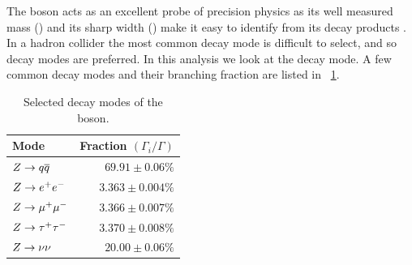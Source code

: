 The \Z boson acts as an excellent probe of precision physics as its well
measured mass (\Zmass) and its sharp width (\Zwidth) make it easy to identify
from its decay products \cite{pdg2014}. In a hadron collider the most common
\Ztoqq decay mode is difficult to select, and so \Ztoll decay modes are
preferred. In this analysis we look at the \Ztoee decay mode. A few common
decay modes and their branching fraction are listed in
\TAB~\ref{table:z_decays}.

\begin{table}[h]
\centering
\begin{center}
    \begin{tabular}{ l  r }
        Mode & Fraction $\left( \Gamma_{i} / \Gamma \right)$ \\ \hline
        $Z \to q \overline{q}$ & $69.91 \pm 0.06\%$ \\
        $Z \to e^{+} e^{-}$ & $3.363 \pm 0.004\%$ \\
        $Z \to \mu^{+} \mu^{-}$ & $3.366 \pm 0.007\%$ \\
        $Z \to \tau^{+} \tau^{-}$ & $3.370 \pm 0.008\%$ \\
        $Z \to \nu \nu$ & $20.00 \pm 0.06\%$ \\
    \end{tabular}
    \caption{
        Selected decay modes of the \Z boson.
    }
\label{table:z_decays}
\end{center}
\end{table}

